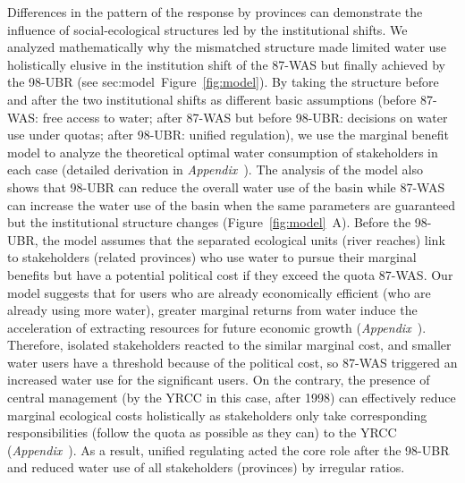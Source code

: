 \label{discussion-2}
Differences in the pattern of the response by provinces can demonstrate the influence of social-ecological structures led by the institutional shifts.
We analyzed mathematically why the mismatched structure made limited water use holistically elusive in the institution shift of the 87-WAS but finally achieved by the 98-UBR (see \refname{sec:model}~Figure~\ref{fig:model}).
By taking the structure before and after the two institutional shifts as different basic assumptions (before 87-WAS: free access to water; after 87-WAS but before 98-UBR: decisions on water use under quotas; after 98-UBR: unified regulation), we use the marginal benefit model to analyze the theoretical optimal water consumption of stakeholders in each case (detailed derivation in \textit{Appendix~}).
The analysis of the model also shows that 98-UBR can reduce the overall water use of the basin while 87-WAS can increase the water use of the basin when the same parameters are guaranteed but the institutional structure changes (Figure~\ref{fig:model}~A).
Before the 98-UBR, the model assumes that the separated ecological units (river reaches) link to stakeholders (related provinces) who use water to pursue their marginal benefits but have a potential political cost if they exceed the quota 87-WAS.
Our model suggests that for users who are already economically efficient (who are already using more water), greater marginal returns from water induce the acceleration of extracting resources for future economic growth (\textit{Appendix~}).
Therefore, isolated stakeholders reacted to the similar marginal cost, and smaller water users have a threshold because of the political cost, so 87-WAS triggered an increased water use for the significant users.
On the contrary, the presence of central management (by the YRCC in this case, after 1998) can effectively reduce marginal ecological costs holistically as stakeholders only take corresponding responsibilities (follow the quota as possible as they can) to the YRCC (\textit{Appendix~}).
As a result, unified regulating acted the core role after the 98-UBR and reduced water use of all stakeholders (provinces) by irregular ratios.

